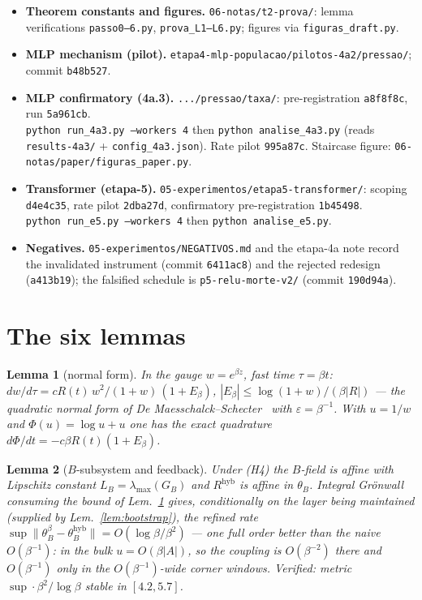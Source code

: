 \documentclass[11pt]{article}
\newtheorem{lemma}{Lemma}
\begin{document}
{\sloppy
\begin{itemize}
\item \textbf{Theorem constants and figures.} \texttt{06-notas/t2-prova/}: lemma
verifications \texttt{passo0--6.py}, \texttt{prova\_L1--L6.py}; figures via
\texttt{figuras\_draft.py}.
\item \textbf{MLP mechanism (pilot).}
\texttt{etapa4-mlp-populacao/pilotos-4a2/pressao/}; commit \texttt{b48b527}.
\item \textbf{MLP confirmatory (4a.3).} \texttt{.../pressao/taxa/}: pre-registration
\texttt{a8f8f8c}, run \texttt{5a961cb}. \\
\texttt{python run\_4a3.py --workers 4} then \texttt{python analise\_4a3.py}
(reads \texttt{results-4a3/} + \texttt{config\_4a3.json}). Rate pilot
\texttt{995a87c}. Staircase figure: \texttt{06-notas/paper/figuras\_paper.py}.
\item \textbf{Transformer (etapa-5).} \texttt{05-experimentos/etapa5-transformer/}:
scoping \texttt{d4e4c35}, rate pilot \texttt{2dba27d}, confirmatory
pre-registration \texttt{1b45498}. \\
\texttt{python run\_e5.py --workers 4} then \texttt{python analise\_e5.py}.
\item \textbf{Negatives.} \texttt{05-experimentos/NEGATIVOS.md} and the etapa-4a
note record the invalidated instrument (commit \texttt{6411ac8}) and the rejected
redesign (\texttt{a413b19}); the falsified schedule is
\texttt{p5-relu-morte-v2/} (commit \texttt{190d94a}).
\end{itemize}
\par}

\appendix
\section{The six lemmas}\label{app:lemmas}

\begin{lemma}[normal form]\label{lem:gauge}
In the gauge $w=e^{\beta z}$, fast time $\tau=\beta t$:
$dw/d\tau=cR(t)\,w^2/(1+w)\,(1+E_\beta)$, $|E_\beta|\le\log(1+w)/(\beta|R|)$ ---
the quadratic normal form of De Maesschalck--Schecter~\cite{DMS16} with
$\varepsilon=\beta^{-1}$. With $u=1/w$ and $\Phi(u)=\log u+u$ one has the exact
quadrature $d\Phi/dt=-c\beta R(t)(1+E_\beta)$.
\end{lemma}

\begin{lemma}[$B$-subsystem and feedback]\label{lem:gronwall}
Under (H4) the $B$-field is affine with Lipschitz constant
$L_B=\lambda_{\max}(G_B)$ and $R^{\mathrm{hyb}}$ is affine in $\theta_B$. Integral
Gr\"onwall consuming the bound of Lem.~\ref{lem:gauge} gives, conditionally on the
layer being maintained (supplied by Lem.~\ref{lem:bootstrap}), the refined rate
$\sup\|\theta_B^\beta-\theta_B^{\mathrm{hyb}}\|=O(\log\beta/\beta^{2})$ --- one
full order better than the naive $O(\beta^{-1})$: in the bulk $u=O(\beta|A|)$, so
the coupling is $O(\beta^{-2})$ there and $O(\beta^{-1})$ only in the
$O(\beta^{-1})$-wide corner windows. Verified: metric
$\sup\cdot\beta^2/\log\beta$ stable in $[4.2,5.7]$.
\end{lemma}
\end{document}
